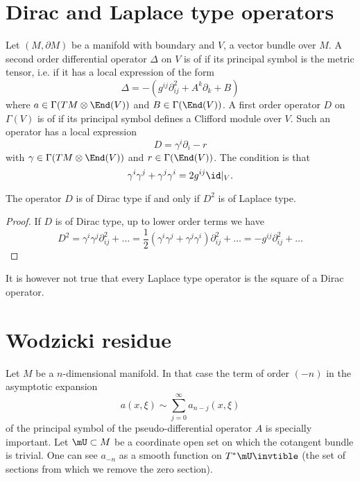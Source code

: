 \section{Dirac and Laplace type operators}

Let $(M,\partial M)$ be a manifold with boundary and $V$, a vector bundle over $M$. A second order differential operator $\Delta$ on $V$ is of  if its principal symbol is the metric tensor, i.e. if it has a local expression of the form
\begin{equation}
	\Delta = -(g^{ij}\partial^2_{ij}+A^k\partial_k+B)
\end{equation}
where $a\in \Gamma(TM\otimes\End(V))$ and $B\in\Gamma(\End(V))$. A first order operator $D$ on $\Gamma(V)$ is of  if its principal symbol defines a Clifford module over $V$. Such an operator has a local expression
\begin{equation}			\label{EqFormGeneDirac}
	D=\gamma^i\partial_i-r
\end{equation}
with $\gamma\in\Gamma(TM\otimes\End(V))$ and $r\in\Gamma(\End(V))$. The condition is that
\begin{equation}
	\gamma^i\gamma^j+\gamma^j\gamma^i=2g^{ij}\id|_V.
\end{equation}

\begin{proposition}
	The operator $D$ is of Dirac type if and only if $D^2$ is of Laplace type.
\end{proposition}

\begin{proof}
	If $D$ is of Dirac type, up to lower order terms we have
	\[
		D^2=\gamma^i\gamma^j\partial^2_{ij}+\ldots=\frac{ 1 }{2}(\gamma^i\gamma^j+\gamma^j\gamma^i)\partial^2_{ij}+\ldots=-g^{ij}\partial^2_{ij}+\ldots
	\]
\end{proof}
It is however not true that every Laplace type operator is the square of a Dirac operator.

\section{Wodzicki residue}

Let $M$ be a $n$-dimensional manifold. In that case the term of order $(-n)$ in the asymptotic expansion
\[
	a(x,\xi)\sim\sum_{j=0}^{\infty}a_{n-j}(x,\xi)
\]
of the principal symbol of the pseudo-differential operator $A$ is specially important. Let $\mU\subset M$ be a coordinate open set on which the cotangent bundle is trivial. One can see $a_{-n}$ as a smooth function on $T^*\mU\invtible$ (the set of sections from which we remove the zero section).

